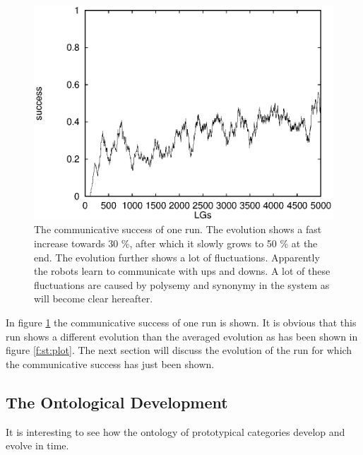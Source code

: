 \begin{figure}[t]
\centerline{\includegraphics[width=12cm]{basic/cs0.eps}}
\caption{The communicative success of one run. The evolution shows a fast increase towards 30 \%, after which it slowly grows to 50 \% at the end. The evolution further shows a lot of fluctuations. Apparently the robots learn to communicate with ups and downs. A lot of these fluctuations are caused by polysemy and synonymy in the system as will become clear hereafter.}
\label{f:st:cs0}
\end{figure}

In figure \ref{f:st:cs0} the communicative success of one run is shown. It is obvious that this run shows a different evolution than the averaged evolution as has been shown in figure \ref{f:st:plot}. The next section will discuss the evolution of the run for which the communicative success has just been shown.

\subsection{The Ontological Development}\label{s:cat:evol}

It is interesting to see how the ontology of prototypical categories develop and evolve in time.

